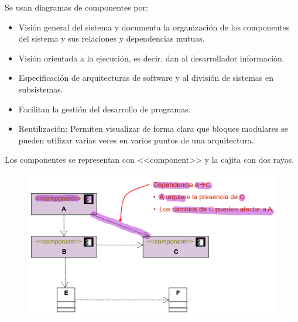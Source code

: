 \documentclass[12pt, twoside, openright]{report} %
\begin{document}
Se usan diagramas de componentes por:
\begin{itemize} 
    \item Visión general del sistema y documenta la organización de los
      componentes del sistema y sus relaciones y dependencias mutuas.
    \item Visión orientada a la ejecución, es decir, dan al desarrollador
      información.
    \item Especificación de arquitecturas de software y al división de
      sistemas en subsistemas.
    \item Facilitan la gestión del desarrollo de programas.
    \item Reutilización: Permiten visualizar de forma clara que bloques
      modulares se pueden utilizar varias veces en varios puntos de una
      arquitectura.
\end{itemize}

Los componentes se representan con <<component>> y la
cajita con dos rayas.
\begin{figure}[H]
	{\includegraphics[scale=.3]{Untitled 32.png}}
\end{figure}
\end{document}
